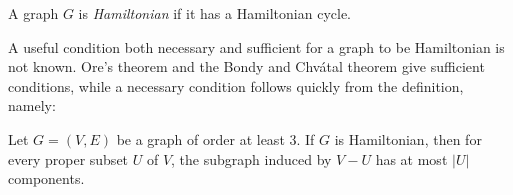 \documentclass{article}
\begin{document}
A graph $G$ is \emph{Hamiltonian} if it has a Hamiltonian cycle.

A useful condition both necessary and sufficient for a graph to be Hamiltonian is not known.  Ore's theorem and the Bondy and Chv\'atal theorem give sufficient conditions, while a necessary condition follows quickly from the definition, namely:

Let $G=(V,E)$ be a graph of order at least 3. If $G$ is Hamiltonian, then for every proper subset $U$ of $V$, the subgraph induced by $V-U$ has at most $|U|$ components.
\end{document}
